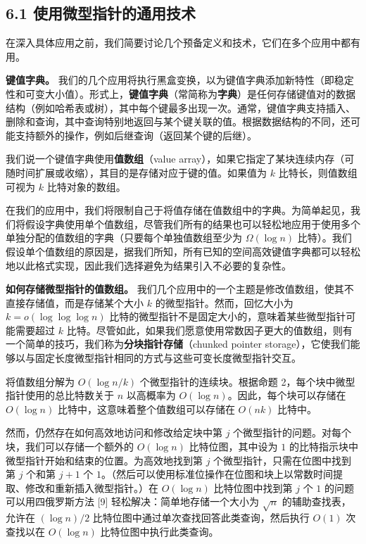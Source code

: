 \documentclass[12pt,a4paper]{ctexart}
\theoremstyle{remark}
\begin{document}
\subsection{6.1 使用微型指针的通用技术}
在深入具体应用之前，我们简要讨论几个预备定义和技术，它们在多个应用中都有用。

\textbf{键值字典。} 我们的几个应用将执行黑盒变换，以为键值字典添加新特性（即稳定性和可变大小值）。形式上，\textbf{键值字典}（常简称为\textbf{字典}）是任何存储键值对的数据结构（例如哈希表或树），其中每个键最多出现一次。通常，键值字典支持插入、删除和查询，其中查询特别地返回与某个键关联的值。根据数据结构的不同，还可能支持额外的操作，例如后继查询（返回某个键的后继）。

我们说一个键值字典使用\textbf{值数组}（value array），如果它指定了某块连续内存（可随时间扩展或收缩），其目的是存储对应于键的值。如果值为 $k$ 比特长，则值数组可视为 $k$ 比特对象的数组。

在我们的应用中，我们将限制自己于将值存储在值数组中的字典。为简单起见，我们将假设字典使用单个值数组，尽管我们所有的结果也可以轻松地应用于使用多个单独分配的值数组的字典（只要每个单独值数组至少为 $\Omega(\log n)$ 比特）。我们假设单个值数组的原因是，据我们所知，所有已知的空间高效键值字典都可以轻松地以此格式实现，因此我们选择避免为结果引入不必要的复杂性。

\textbf{如何存储微型指针的值数组。} 我们几个应用中的一个主题是修改值数组，使其不直接存储值，而是存储某个大小 $k$ 的微型指针。然而，回忆大小为 $k=o(\log\log\log n)$ 比特的微型指针不是固定大小的，意味着某些微型指针可能需要超过 $k$ 比特。尽管如此，如果我们愿意使用常数因子更大的值数组，则有一个简单的技巧，我们称为\textbf{分块指针存储}（chunked pointer storage），它使我们能够以与固定长度微型指针相同的方式与这些可变长度微型指针交互。

将值数组分解为 $O(\log n/k)$ 个微型指针的连续块。根据命题 2，每个块中微型指针使用的总比特数关于 $n$ 以高概率为 $O(\log n)$。因此，每个块可以存储在 $O(\log n)$ 比特中，这意味着整个值数组可以存储在 $O(nk)$ 比特中。

然而，仍然存在如何高效地访问和修改给定块中第 $j$ 个微型指针的问题。对每个块，我们可以存储一个额外的 $O(\log n)$ 比特位图，其中设为 $1$ 的比特指示块中微型指针开始和结束的位置。为高效地找到第 $j$ 个微型指针，只需在位图中找到第 $j$ 个和第 $j+1$ 个 $1$。（然后可以使用标准位操作在位图和块上以常数时间提取、修改和重新插入微型指针。）在 $O(\log n)$ 比特位图中找到第 $j$ 个 $1$ 的问题可以用四俄罗斯方法 [9] 轻松解决：简单地存储一个大小为 $\sqrt{n}$ 的辅助查找表，允许在 $(\log n)/2$ 比特位图中通过单次查找回答此类查询，然后执行 $O(1)$ 次查找以在 $O(\log n)$ 比特位图中执行此类查询。
\end{document}

